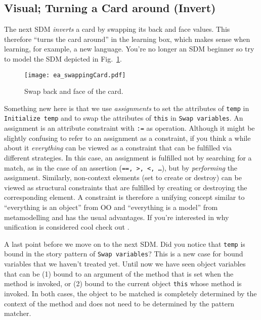 \newpage
\subsection{Visual; Turning a Card around (Invert)}
\visHeader
\hypertarget{invertCard vis}{}

The next SDM \emph{inverts} a card by swapping its back and face values. This therefore ``turns the card around'' in the learning box, which makes sense when
learning, for example, a new language. You're no longer an SDM beginner so try to model the SDM depicted in Fig.~\ref{fig:sdm_invert}.

\begin{figure}[htbp]
\begin{center}
  \texttt{[image: ea\_swappingCard.pdf]}
  \caption{Swap back and face of the card.}  
  \label{fig:sdm_invert}
\end{center}
\end{figure}

Something new here is that we use \emph{assignments} to set the attributes of \texttt{temp} in \texttt{Initialize temp} and to swap the
attributes of \texttt{this} in \texttt{Swap variables}. An assignment is an attribute constraint with \texttt{:=} as operation.  Although it might be slightly
confusing to refer to an assignment as a constraint, if you think a while about it \emph{everything} can be viewed as a constraint that can be fulfilled via
different strategies. In this case, an assignment is fulfilled not by searching  for a match, as in the case of an assertion (\texttt{==, >, <,
\ldots}), but by \emph{performing} the assignment. Similarly, non-context elements (set to create or destroy) can be viewed as structural constraints that are
fulfilled by creating or destroying the corresponding element.  A constraint is therefore a unifying concept similar to ``everything is an object'' from OO and
``everything is a model'' from metamodelling and has the usual advantages.  If  you're interested in why unification is considered cool check
out \cite{BEZ05}.

A last point before we move on to the next SDM.  Did you notice that \texttt{temp} is bound in the story pattern of \texttt{Swap variables}?  This is a new case
for bound variables that we haven't treated yet. Until now we have seen object variables that can be (1) bound to an argument of the method that is set when the
method is invoked, or (2) bound to the current object \texttt{this} whose method is invoked. In both cases, the object to be matched is completely determined by
the context of the method and does not need to be determined by the pattern matcher.

